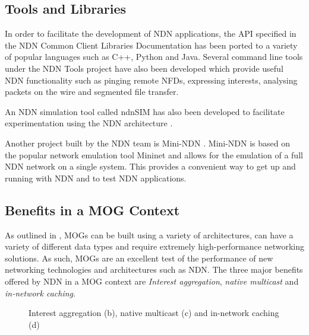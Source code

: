\subsection{Tools and Libraries}\label{sec:ndn-tools}
In order to facilitate the development of NDN applications, the API specified in the NDN Common Client Libraries Documentation \cite{ndn-ccl} has been ported to a variety of popular languages such as C++, Python and Java. Several command line tools under the NDN Tools project \cite{ndn-tools} have also been developed which provide useful NDN functionality such as pinging remote NFDs, expressing interests, analysing packets on the wire and segmented file transfer.

An NDN simulation tool called ndnSIM \cite{ndn-sim-webpage} has also been developed to facilitate experimentation using the NDN architecture \cite{ndnsim}.  

Another project built by the NDN team is Mini-NDN \cite{mini-ndn}. Mini-NDN is based on the popular network emulation tool Mininet \cite{mininet} and allows for the emulation of a full NDN network on a single system. This provides a convenient way to get up and running with NDN and to test NDN applications.





\subsection{Benefits in a MOG Context}\label{sec:sota:mog-ndn-benefits}
As outlined in , MOGs can be built using a variety of architectures, can have a variety of different data types and require extremely high-performance networking solutions. As such, MOGs are an excellent test of the performance of new networking technologies and architectures such as NDN. The three major benefits offered by NDN in a MOG context are \textit{Interest aggregation}, \textit{native multicast} and \textit{in-network caching}.

\begin{figure}[H]
    \centering
    \caption{Interest aggregation (b), native multicast (c) and in-network caching (d)}
    \label{fig:agg-multicast}
\end{figure}


